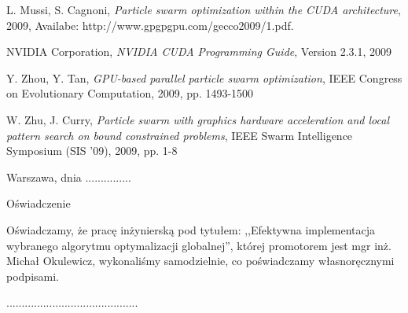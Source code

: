 \documentclass[12pt, twoside, openany, abstract=on]{report}
\theoremstyle{definition}
\begin{document}
\begin{thebibliography}{11}
 L. Mussi, S. Cagnoni, \emph{Particle swarm optimization within the CUDA architecture}, 2009, Availabe: http://www.gpgpgpu.com/gecco2009/1.pdf.

 NVIDIA Corporation, \emph{NVIDIA CUDA Programming Guide}, Version 2.3.1, 2009

 Y. Zhou, Y. Tan, \emph{GPU-based parallel particle swarm optimization}, IEEE Congress on Evolutionary Computation, 2009, pp. 1493-1500

 W. Zhu, J. Curry, \emph{Particle swarm with graphics hardware acceleration and local pattern search on bound constrained problems}, IEEE Swarm Intelligence Symposium (SIS '09), 2009, pp. 1-8

\end{thebibliography}
\clearpage
\pagestyle{empty}
\noindent Warszawa, dnia ...............
\vspace{5cm}
\begin{center}
\LARGE{Oświadczenie}
\end{center}
Oświadczamy, że pracę inżynierską pod tytułem: ,,Efektywna implementacja wybranego algorytmu optymalizacji globalnej'', której promotorem jest mgr inż. Michał Okulewicz, wykonaliśmy samodzielnie, co poświadczamy własnoręcznymi podpisami.
\vspace{2cm}
\begin{flushright}
...........................................
\end{flushright}
\end{document}
